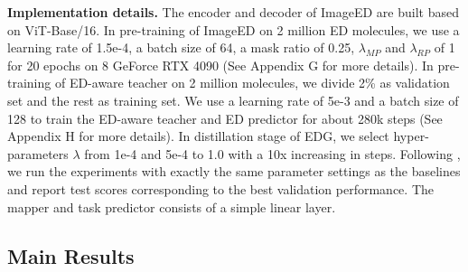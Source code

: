 \documentclass{article}
\begin{document}
\textbf{Implementation details.} The encoder and decoder of ImageED are built based on ViT-Base/16. In pre-training of ImageED on 2 million ED molecules, we use a learning rate of 1.5e-4, a batch size of 64, a mask ratio of 0.25, $\lambda_{MP}$ and $\lambda_{RP}$ of 1 for 20 epochs on 8 GeForce RTX 4090 (See Appendix G for more details). In pre-training of ED-aware teacher on 2 million molecules, we divide 2\% as validation set and the rest as training set. We use a learning rate of 5e-3 and a batch size of 128 to train the ED-aware teacher and ED predictor for about 280k steps (See Appendix H for more details). In distillation stage of EDG, we select hyper-parameters $\lambda$ from 1e-4 and 5e-4 to 1.0 with a 10x increasing in steps. Following \cite{wang2024enhancing,liu2024symmetry}, we run the experiments with exactly the same parameter settings as the baselines and report test scores corresponding to the best validation performance. The mapper and task predictor consists of a simple linear layer.

\subsection{Main Results}
\end{document}
